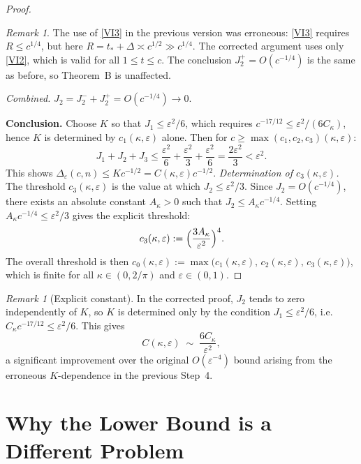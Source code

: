 \documentclass[12pt,a4paper]{amsart}
\theoremstyle{definition}
\theoremstyle{remark}
\newtheorem{remark}[theorem]{Remark}
\newtheorem*{remark*}{Remark}
\begin{document}
\begin{proof}
\begin{remark*}
The use of \eqref{VI3} in the previous version
was erroneous: \eqref{VI3} requires $R \le c^{1/4}$,
but here $R = t_* + \Delta \asymp c^{1/2} \gg c^{1/4}$.
The corrected argument uses only \eqref{VI2},
which is valid for all $1 \le t \le c$.
The conclusion $J_2^+ = O(c^{-1/4})$
is the same as before, so Theorem~B is unaffected.
\end{remark*}

\textit{Combined.}
$J_2 = J_2^- + J_2^+ = O(c^{-1/4}) \to 0$.

\textbf{Conclusion.}
Choose $K$ so that $J_1 \le \varepsilon^2/6$,
which requires $c^{-17/12} \le \varepsilon^2/(6C_\kappa)$,
hence $K$ is determined by $c_1(\kappa,\varepsilon)$ alone.
Then for $c \ge \max(c_1,c_2,c_3)(\kappa,\varepsilon)$:
\[
J_1 + J_2 + J_3
\le \frac{\varepsilon^2}{6} + \frac{\varepsilon^2}{3}
+ \frac{\varepsilon^2}{6}
= \frac{2\varepsilon^2}{3} < \varepsilon^2.
\]
This shows $\Delta_\varepsilon(c,n) \le Kc^{-1/2}
= C(\kappa,\varepsilon) c^{-1/2}$.
\textit{Determination of $c_3(\kappa,\varepsilon)$.}
The threshold $c_3(\kappa,\varepsilon)$ is the value at which
$J_2 \le \varepsilon^2/3$.
Since $J_2 = O(c^{-1/4})$, there exists an absolute constant
$A_\kappa > 0$ such that $J_2 \le A_\kappa c^{-1/4}$.
Setting $A_\kappa c^{-1/4} \le \varepsilon^2/3$ gives the
explicit threshold:
\[
  c_3(\kappa,\varepsilon)
  := \Bigl(\frac{3A_\kappa}{\varepsilon^2}\Bigr)^4.
\]
The overall threshold is then
$c_0(\kappa,\varepsilon)
:= \max\bigl(c_1(\kappa,\varepsilon),\,
              c_2(\kappa,\varepsilon),\,
              c_3(\kappa,\varepsilon)\bigr)$,
which is finite for all
$\kappa \in (0,2/\pi)$ and $\varepsilon \in (0,1)$.
\end{proof}

\begin{remark}[Explicit constant]
\label{rem:explicit-const}
In the corrected proof, $J_2$ tends to zero
independently of $K$, so $K$ is determined
only by the condition $J_1 \le \varepsilon^2/6$,
i.e.\ $C_\kappa c^{-17/12} \le \varepsilon^2/6$.
This gives
\[
C(\kappa,\varepsilon)
\;\sim\; \frac{6C_\kappa}{\varepsilon^2},
\]
a significant improvement over the original
$O(\varepsilon^{-4})$ bound arising from the
erroneous $K$-dependence in the previous Step~4.
\end{remark}

\section{Why the Lower Bound is a Different Problem}
\label{sec:barrier}
\end{document}
